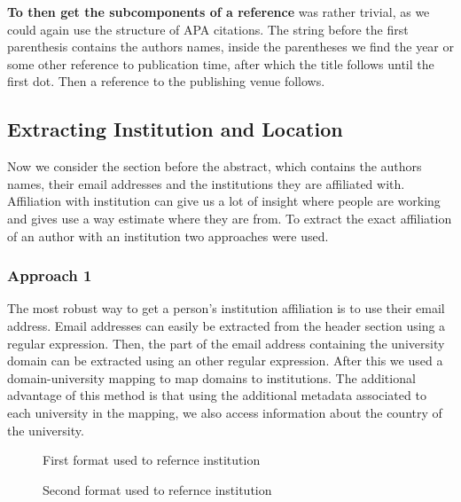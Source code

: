 \documentclass[article,twocolumn]{IEEEtran}
\begin{document}
\textbf{To then get the subcomponents of a reference} was rather
trivial, as we could again use the structure of APA citations. The
string before the first parenthesis contains the authors names, inside
the parentheses we find the year or some other reference to publication
time, after which the title follows until the first dot. Then a
reference to the publishing venue follows.

    \hypertarget{extracting-institution-and-location}{%
\subsection{Extracting Institution and
Location}\label{extracting-institution-and-location}}

Now we consider the section before the abstract, which contains the
authors names, their email addresses and the institutions they are
affiliated with. Affiliation with institution can give us a lot of
insight where people are working and gives use a way estimate where they
are from. To extract the exact affiliation of an author with an
institution two approaches were used.

\hypertarget{approach-1}{%
\subsubsection{Approach 1}\label{approach-1}}

The most robust way to get a person's institution affiliation is to use
their email address. Email addresses can easily be extracted from the
header section using a regular expression. Then, the part of the email
address containing the university domain can be extracted using an other
regular expression. After this we used a domain-university mapping
\cite{mapping} to map domains to institutions. The additional advantage
of this method is that using the additional metadata associated to each
university in the mapping, we also access information about the country
of the university.


    \begin{figure}
        \begin{center}\end{center}
        \caption{First format used to refernce institution}
        \label{figA}
    \end{figure}
    

    \begin{figure}
        \begin{center}\end{center}
        \caption{Second format used to refernce institution}
        \label{figB}
    \end{figure}
    
\end{document}
